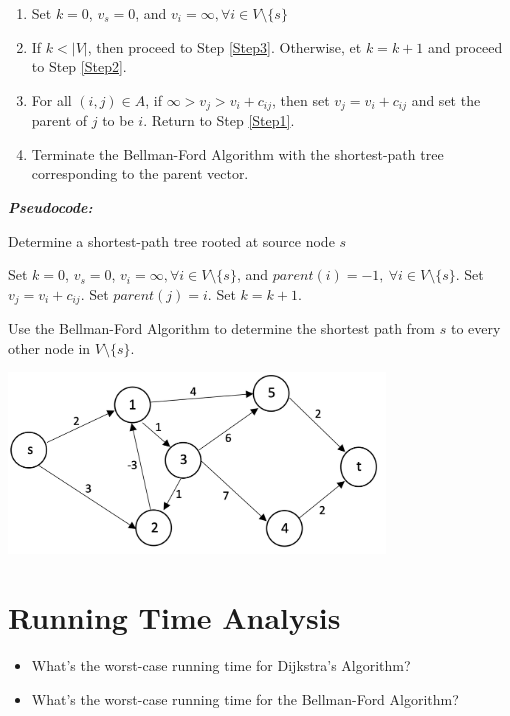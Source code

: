 \documentclass[12pt]{article}
\theoremstyle{definition}
\begin{document}
\begin{enumerate}

\item Set $k = 0$, $v_s = 0$, and $v_i = \infty, \forall i \in V \setminus \{s\}$ \label{Step0}
\item If  $k < |V| $, then proceed to Step \ref{Step3}. Otherwise,  et $k = k + 1$ and proceed to Step \ref{Step2}. \label{Step1}
\item For all $(i,j) \in A$, if $\infty > v_j > v_i + c_{ij}$, then set $v_j = v_i + c_{ij}$ and set the parent of $j$ to be $i$. Return to Step \ref{Step1}.  \label{Step2}
\item Terminate the Bellman-Ford Algorithm with the shortest-path tree corresponding to the parent vector. \label{Step3}
\end{enumerate}



\emph{\textbf{Pseudocode:}}


\begin{algorithm}
\caption{Determine a shortest-path tree rooted at source node $s$}
\begin{algorithmic} 
\STATE  Set $k = 0$, $v_s = 0$, $v_i = \infty, \forall i \in V \setminus \{s\}$, and $parent(i) = -1, \ \forall i \in V \setminus \{s\}$. 
			\STATE Set $v_j = v_i + c_{ij}$.
			\STATE Set $parent(j) = i$.
		\ENDIF
	\ENDFOR
	\STATE Set $k = k + 1$.
\ENDWHILE
\end{algorithmic}
\end{algorithm}


 \newpage
Use the Bellman-Ford Algorithm to determine the shortest path from $s$ to every other node in $V \setminus \{s\}$.

\begin{center}
\includegraphics[width=10cm]{shortestpathnegativecycles}
\end{center}

\vfill


\newpage

\section{Running Time Analysis}

\begin{itemize}

\item What's the worst-case running time for Dijkstra's Algorithm?

\vfill


\item What's the worst-case running time for the Bellman-Ford Algorithm?

\vfill
\end{itemize}
\end{document}
